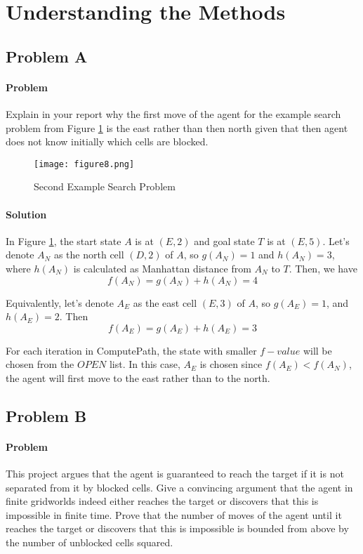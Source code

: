 \section{Understanding the Methods}

\subsection{Problem A} 

\paragraph{Problem}
Explain in your report why the first move of the agent for the example search
problem from Figure \ref{fig:figure8} is the east rather than then north given
that then agent does not know initially which cells are blocked.

\begin{figure}[h!]
  \centering
  \texttt{[image: figure8.png]}
  \caption{Second Example Search Problem}
  \label{fig:figure8}
\end{figure}

\paragraph{Solution}
In Figure \ref{fig:figure8}, the start state $A$ is at $(E,2)$ and goal state
$T$ is at $(E,5)$. Let's denote $A_N$ as the north cell $(D,2)$ of $A$, so
$g(A_N)=1$ and $h(A_N)=3$, where $h(A_N)$ is calculated as Manhattan distance
from $A_N$ to $T$. Then, we have
\begin{equation*}
  f(A_N) = g(A_N) + h(A_N) = 4 
\end{equation*}

Equivalently, let's denote $A_E$ as the east cell $(E,3)$ of $A$, so
$g(A_E)=1$, and $h(A_E)=2$. Then
\begin{equation*}
  f(A_E) = g(A_E) + h(A_E) = 3
\end{equation*}

For each iteration in ComputePath, the state with smaller $f-value$ will be
chosen from the $OPEN$ list. In this case, $A_E$ is chosen since
$f(A_E)<f(A_N)$, the agent will first move to the east rather than to the
north.

\subsection{Problem B}

\paragraph{Problem}
This project argues that the agent is guaranteed to reach the target if it is
not separated from it by blocked cells. Give a convincing argument that the
agent in finite gridworlds indeed either reaches the target or discovers that
this is impossible in finite time. Prove that the number of moves of the agent
until it reaches the target or discovers that this is impossible is bounded
from above by the number of unblocked cells squared.

